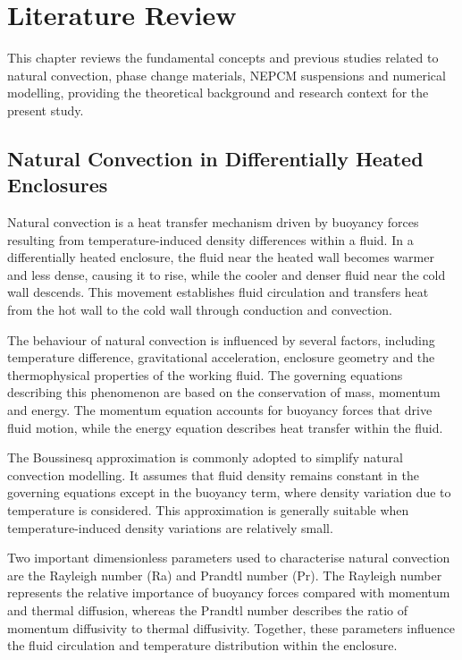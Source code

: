 \chapter{Literature Review}

This chapter reviews the fundamental concepts and previous studies related to natural convection, phase change materials, NEPCM suspensions and numerical modelling, providing the theoretical background and research context for the present study.

\section{Natural Convection in Differentially Heated Enclosures}

Natural convection is a heat transfer mechanism driven by buoyancy forces resulting from temperature-induced density differences within a fluid. In a differentially heated enclosure, the fluid near the heated wall becomes warmer and less dense, causing it to rise, while the cooler and denser fluid near the cold wall descends. This movement establishes fluid circulation and transfers heat from the hot wall to the cold wall through conduction and convection.

The behaviour of natural convection is influenced by several factors, including temperature difference, gravitational acceleration, enclosure geometry and the thermophysical properties of the working fluid. The governing equations describing this phenomenon are based on the conservation of mass, momentum and energy. The momentum equation accounts for buoyancy forces that drive fluid motion, while the energy equation describes heat transfer within the fluid.

The Boussinesq approximation is commonly adopted to simplify natural convection modelling. It assumes that fluid density remains constant in the governing equations except in the buoyancy term, where density variation due to temperature is considered. This approximation is generally suitable when temperature-induced density variations are relatively small.

Two important dimensionless parameters used to characterise natural convection are the Rayleigh number (Ra) and Prandtl number (Pr). The Rayleigh number represents the relative importance of buoyancy forces compared with momentum and thermal diffusion, whereas the Prandtl number describes the ratio of momentum diffusivity to thermal diffusivity. Together, these parameters influence the fluid circulation and temperature distribution within the enclosure.

